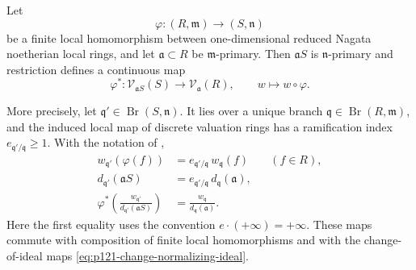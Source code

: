 \begin{proposition}
\label{prop:p126-finite-reduced-curve-link}
Let
\[
 \varphi:(R,\mathfrak m)\longrightarrow(S,\mathfrak n)
\]
be a finite local homomorphism between one-dimensional reduced Nagata
noetherian local rings, and let \(\mathfrak a\subset R\) be
\(\mathfrak m\)-primary.  Then \(\mathfrak aS\) is
\(\mathfrak n\)-primary and restriction defines a continuous map
\[
 \varphi^*: \mathcal V_{\mathfrak aS}(S)\longrightarrow
             \mathcal V_{\mathfrak a}(R),
 \qquad w\longmapsto w\circ\varphi.
 \tag{\(\ddagger\)}\label{eq:p126-finite-curve-link-map}
\]

More precisely, let \(\mathfrak q'\in\operatorname{Br}(S,\mathfrak n)\).
It lies over a unique branch
\(\mathfrak q\in\operatorname{Br}(R,\mathfrak m)\), and the induced local
map of discrete valuation rings has a ramification index
\(e_{\mathfrak q'/\mathfrak q}\geq1\).  With the notation of
,
\[
 \begin{aligned}
 w_{\mathfrak q'}(\varphi(f))
   &=e_{\mathfrak q'/\mathfrak q}\,w_{\mathfrak q}(f)
       &&(f\in R),\\
 d_{\mathfrak q'}(\mathfrak aS)
   &=e_{\mathfrak q'/\mathfrak q}\,
       d_{\mathfrak q}(\mathfrak a),\\
 \varphi^*\!\left(
   \frac{w_{\mathfrak q'}}{d_{\mathfrak q'}(\mathfrak aS)}
                 \right)
   &=\frac{w_{\mathfrak q}}{d_{\mathfrak q}(\mathfrak a)}.
 \end{aligned}
 \tag{\(\heartsuit\)}\label{eq:p126-ramification-cancellation}
\]
Here the first equality uses the convention
\(e\cdot(+\infty)=+\infty\).  These maps commute with composition of
finite local homomorphisms and with the change-of-ideal maps
\eqref{eq:p121-change-normalizing-ideal}.
\end{proposition}

